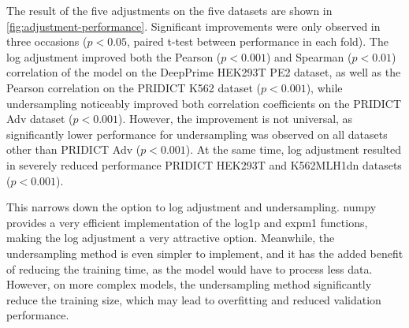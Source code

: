 The result of the five adjustments on the five datasets are shown in \autoref{fig:adjustment-performance}. Significant improvements were only observed in three occasions ($p<0.05$, paired t-test between performance in each fold). The log adjustment improved both the Pearson ($p<0.001$) and Spearman ($p<0.01$) correlation of the model on the DeepPrime HEK293T PE2 dataset, as well as the Pearson correlation on the PRIDICT K562 dataset ($p<0.001$), while undersampling noticeably improved both correlation coefficients on the PRIDICT Adv dataset ($p<0.001$). However, the improvement is not universal, as significantly lower performance for undersampling was observed on all datasets other than PRIDICT Adv ($p<0.001$). At the same time, log adjustment resulted in severely reduced performance PRIDICT HEK293T and K562MLH1dn datasets ($p<0.001$). 

This narrows down the option to log adjustment and undersampling. numpy provides a very efficient implementation of the log1p and expm1 functions, making the log adjustment a very attractive option. Meanwhile, the undersampling method is even simpler to implement, and it has the added benefit of reducing the training time, as the model would have to process less data. However, on more complex models, the undersampling method significantly reduce the training size, which may lead to overfitting and reduced validation performance.


